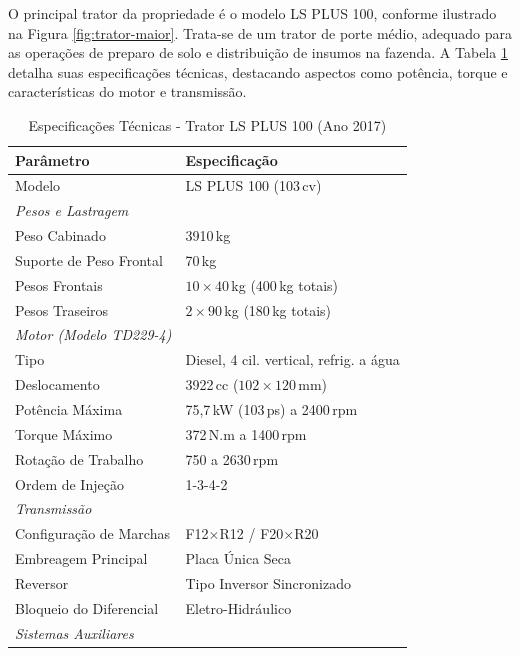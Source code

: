 \documentclass[12pt,openright,oneside,a4paper,hidelinks,espacamento=1.5]{abntex2}
\begin{document}
O principal trator da propriedade é o modelo LS PLUS 100, conforme ilustrado na Figura \ref{fig:trator-maior}. Trata-se de um trator de porte médio, adequado para as operações de preparo de solo e distribuição de insumos na fazenda. A Tabela \ref{tab:trator-ls} detalha suas especificações técnicas, destacando aspectos como potência, torque e características do motor e transmissão.

\begin{table}[H]
    \centering
    \caption{Especificações Técnicas - Trator LS PLUS 100 (Ano 2017)}
    \label{tab:trator-ls}
    \vspace{0.1cm}
    \begin{tabular}{ll}
        \toprule
        \textbf{Parâmetro} & \textbf{Especificação} \\
        \midrule
        Modelo & LS PLUS 100 (103\,cv) \\
        \midrule
        \textit{Pesos e Lastragem} & \\
        Peso Cabinado & 3910\,kg \\
        Suporte de Peso Frontal & 70\,kg \\
        Pesos Frontais & $10 \times 40$\,kg (400\,kg totais) \\
        Pesos Traseiros & $2 \times 90$\,kg (180\,kg totais) \\
        \midrule
        \textit{Motor (Modelo TD229-4)} & \\
        Tipo & Diesel, 4 cil. vertical, refrig. a água \\
        Deslocamento & 3922\,cc ($102 \times 120$\,mm) \\
        Potência Máxima & 75,7\,kW (103\,ps) a 2400\,rpm \\
        Torque Máximo & 372\,N.m a 1400\,rpm \\
        Rotação de Trabalho & 750 a 2630\,rpm \\
        Ordem de Injeção & 1-3-4-2 \\
        \midrule
        \textit{Transmissão} & \\
        Configuração de Marchas & F12$\times$R12 / F20$\times$R20 \\
        Embreagem Principal & Placa Única Seca \\
        Reversor & Tipo Inversor Sincronizado \\
        Bloqueio do Diferencial & Eletro-Hidráulico \\
        \midrule
        \textit{Sistemas Auxiliares} & \\

\end{tabular}
\end{table}
\end{document}
